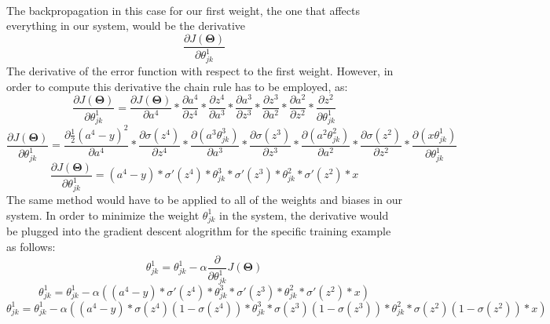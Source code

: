 \documentclass[a4paper,12pt]{article}
\begin{document}
\\ The backpropagation in this case for our first weight, the one that affects everything in our system, would be the derivative \[\frac{\partial J(\boldsymbol{\Theta})}{\partial \theta_{jk}^1}\] The derivative of the error function with respect to the first weight. However, in order to compute this derivative the chain rule has to be employed, as:
\[\frac{\partial J(\boldsymbol{\Theta})}{\partial \theta_{jk}^1} = \frac{\partial J(\boldsymbol{\Theta})}{\partial a^4} * \frac{\partial a^4}{\partial z^4} * \frac{\partial z^4}{\partial a^3} * \frac{\partial a^3}{\partial z^3} * \frac{\partial z^3}{\partial a^2} * \frac{\partial a^2}{\partial z^2} * \frac{\partial z^2}{\partial \theta^1_{jk}}\]
\[\frac{\partial J(\boldsymbol{\Theta})}{\partial \theta_{jk}^1} = \frac{\partial \frac{1}{2}(a^4 - y)^2}{\partial a^4} * \frac{\partial \sigma(z^4)}{\partial z^4} * \frac{\partial (a^3\theta^3_{jk})}{\partial a^3} * \frac{\partial \sigma(z^3)}{\partial z^3} * \frac{\partial (a^2\theta_{jk}^2)}{\partial a^2} * \frac{\partial \sigma(z^2)}{\partial z^2} * \frac{\partial (x\theta_{jk}^1)}{\partial \theta_{jk}^1}\]
\[\frac{\partial J(\boldsymbol{\Theta})}{\partial \theta_{jk}^1} = (a^4 - y) * \sigma'(z^4) * \theta_{jk}^3 * \sigma'(z^3) * \theta_{jk}^2 * \sigma'(z^2) * x\]
The same method would have to be applied to all of the weights and biases in our system. In order to minimize the weight $\theta_{jk}^1$ in the system, the derivative would be plugged into the gradient descent alogrithm for the specific training example as follows:
 \[\theta_{jk}^1 = \theta_{jk}^1 - \alpha \frac{\partial}{\partial\theta_{jk}^1} J(\boldsymbol{\Theta})\]
\[\theta_{jk}^1 = \theta_{jk}^1 - \alpha ((a^4 - y) * \sigma'(z^4) * \theta_{jk}^3 * \sigma'(z^3) * \theta_{jk}^2 * \sigma'(z^2) * x)\]
\[\theta_{jk}^1 = \theta_{jk}^1 - \alpha ((a^4 - y) * \sigma(z^4)(1-\sigma(z^4)) * \theta_{jk}^3 * \sigma(z^3)(1-\sigma(z^3)) * \theta_{jk}^2 * \sigma(z^2)(1-\sigma(z^2)) * x)\]
\end{document}
